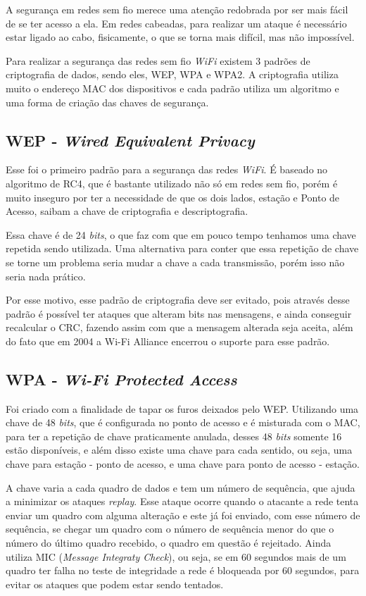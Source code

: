A segurança em redes sem fio merece uma atenção redobrada por ser mais fácil de se ter acesso a ela. Em redes cabeadas, para realizar um ataque é necessário estar ligado ao cabo, fisicamente, o que se torna mais difícil, mas não impossível.

Para realizar a segurança das redes sem fio \textit{WiFi} existem 3 padrões de criptografia de dados, sendo eles, WEP, WPA e WPA2. A criptografia utiliza muito o endereço MAC dos dispositivos e cada padrão utiliza um algoritmo e uma forma de criação das chaves de segurança.

\subsection{WEP - \textit{Wired Equivalent Privacy}}

Esse foi o primeiro padrão para a segurança das redes \textit{WiFi}. É baseado no algoritmo de RC4, que é bastante utilizado não só em redes sem fio, porém é muito inseguro por ter a necessidade de que os dois lados, estação e Ponto de Acesso, saibam a chave de criptografia e descriptografia.

Essa chave é de 24 \textit{bits}, o que faz com que em pouco tempo tenhamos uma chave repetida sendo utilizada. Uma alternativa para conter que essa repetição de chave se torne um problema seria mudar a chave a cada transmissão, porém isso não seria nada prático. 

Por esse motivo, esse padrão de criptografia deve ser evitado, pois através desse padrão é possível ter ataques que alteram bits nas mensagens, e ainda conseguir recalcular o CRC, fazendo assim com que a mensagem alterada seja aceita, além do fato que em 2004 a Wi-Fi Alliance encerrou o suporte para esse padrão.

\subsection{WPA - \textit{Wi-Fi Protected Access}}

Foi criado com a finalidade de tapar os furos deixados pelo WEP. Utilizando uma chave de 48 \textit{bits}, que é configurada no ponto de acesso e é misturada com o MAC, para ter a repetição de chave praticamente anulada, desses 48 \textit{bits} somente 16 estão disponíveis, e além disso existe uma chave para cada sentido, ou seja, uma chave para estação - ponto de acesso, e uma chave para ponto de acesso - estação.

A chave varia a cada quadro de dados e tem um número de sequência, que ajuda a minimizar os ataques \textit{replay}. Esse ataque ocorre quando o atacante a rede tenta enviar um quadro com alguma alteração e este já foi enviado, com esse número de sequência, se chegar um quadro com o número de sequência menor do que o número do último quadro recebido, o quadro em questão é rejeitado. Ainda utiliza MIC (\textit{Message Integraty Check}), ou seja, se em 60 segundos mais de um quadro ter falha no teste de integridade a rede é bloqueada por 60 segundos, para evitar os ataques que podem estar sendo tentados.

